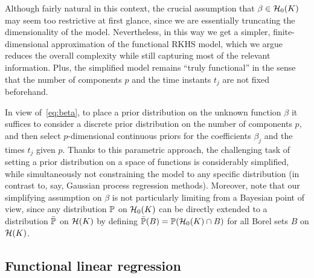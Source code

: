 Although fairly natural in this context, the crucial assumption that \(\beta \in \mathcal{H}_0(K)\) may seem too restrictive at first glance, since we are essentially truncating the dimensionality of the model. Nevertheless, in this way we get a simpler, finite-dimensional approximation of the functional \acs{RKHS} model, which we argue reduces the overall complexity while still capturing most of the relevant information. Plus, the simplified model remains ``truly functional'' in the sense that the number of components \(p\) and the time instants \(t_j\) are not fixed beforehand.

In view of~\eqref{eq:beta}, to place a prior distribution on the unknown function \(\beta\) it suffices to consider a discrete prior distribution on the number of components \(p\), and then select \(p\)-dimensional continuous priors for the coefficients \(\beta_j\) and the times \(t_j\) given \(p\). Thanks to this parametric approach, the challenging task of setting a prior distribution on a space of functions is considerably simplified, while simultaneously not constraining the model to any specific distribution (in contrast to, say, Gaussian process regression methods). Moreover, note that our simplifying assumption on \(\beta\) is not particularly limiting from a Bayesian point of view, since any distribution \(\mathbb{P}\) on \(\mathcal{H}_0(K)\) can be directly extended to a distribution \(\bar{\mathbb{P}}\) on \(\mathcal{H}(K)\) by defining \(\bar{\mathbb{P}}(B) = \mathbb{P}(\mathcal{H}_0(K)\cap B)\) for all Borel sets \(B\) on \(\mathcal{H}(K)\).


\subsection{Functional linear regression}\label{sec:rkhs-linear-model}

